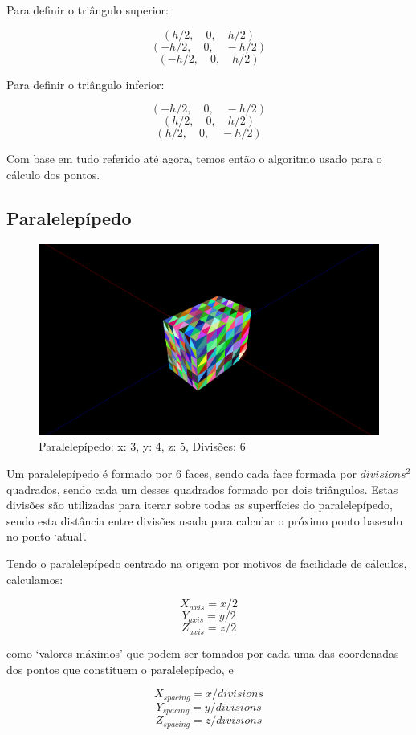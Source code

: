 \documentclass[a4paper]{article}
\begin{document}
Para definir o triângulo superior:

\[(h/2,\quad 0, \quad h/2)\]
\[(-h/2,\quad  0, \quad -h/2)\]
\[(-h/2,\quad  0, \quad h/2)\]

Para definir o triângulo inferior:

\[(-h/2, \quad 0, \quad -h/2)\]
\[(h/2, \quad  0, \quad  h/2)\]
\[(h/2, \quad  0, \quad -h/2)\]

Com base em tudo referido até agora, temos então o algoritmo usado para o cálculo dos pontos.


\subsection{Paralelepípedo}
\begin{figure}[H]
    \centering
    \includegraphics[width=\textwidth]{box.png}
    \caption{Paralelepípedo: x: 3, y: 4, z: 5, Divisões: 6}
\end{figure}

Um paralelepípedo é formado por 6 faces, sendo cada face formada por $divisions^2$ quadrados, sendo cada um desses quadrados formado por dois triângulos. Estas divisões são utilizadas para iterar sobre todas as superfícies do paralelepípedo, sendo esta distância entre divisões usada para calcular o próximo ponto baseado no ponto `atual'.

Tendo o paralelepípedo centrado na origem por motivos de facilidade de cálculos, calculamos:

\[X_{axis} = x / 2\]
\[Y_{axis} = y / 2\]
\[Z_{axis} = z / 2\]

como `valores máximos' que podem ser tomados por cada uma das coordenadas dos pontos que constituem o paralelepípedo, e

\[X_{spacing} = x / divisions\]
\[Y_{spacing} = y / divisions\]
\[Z_{spacing} = z / divisions\]
\end{document}
